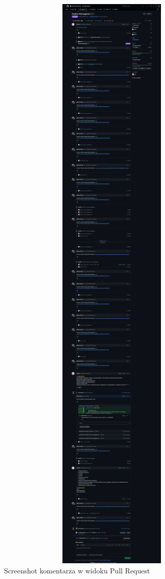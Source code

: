 \begin{figure}[H]
    \centering
    \includegraphics[width=1\textwidth]{attachments/docs-pr}
    \caption{Screenshot komentarza w widoku Pull Request}
\end{figure}

